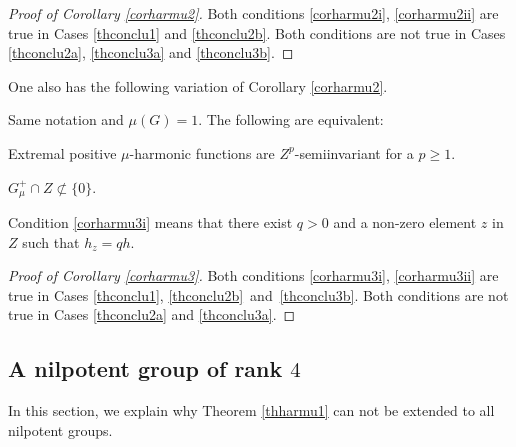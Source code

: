 \begin{proof}[Proof of Corollary \ref{corharmu2}]
Both conditions \eqref{corharmu2i}, \eqref{corharmu2ii}
are true in Cases \eqref{thconclu1} and \eqref{thconclu2b}.
Both conditions
are not true in Cases \eqref{thconclu2a}, \eqref{thconclu3a} and \eqref{thconclu3b}.
\end{proof}

One also has the following variation of Corollary \ref{corharmu2}.

\begin{Cor}
\label{corharmu3}
Same notation and $\mu(G)=1$.
The following are equivalent:
\begin{enumeratei}
\item\label{corharmu3i}
Extremal positive $\mu$-harmonic functions are $Z^{p}$-semiinvariant
for a $p\geq 1$.
\item\label{corharmu3ii}
$G_\mu^+\cap Z\not\subset\{0\}$.
\end{enumeratei}
\end{Cor}

Condition \eqref{corharmu3i} means that there exist $q>0$ and a non-zero element $z$ in $Z$
such that $h_z=qh$.

\begin{proof}[Proof of Corollary \ref{corharmu3}]
Both conditions \eqref{corharmu3i}, \eqref{corharmu3ii}
are true in Cases \eqref{thconclu1}, \eqref{thconclu2b}~and~\eqref{thconclu3b}.
Both conditions
are not true in Cases \eqref{thconclu2a} and \eqref{thconclu3a}.
\end{proof}

\subsection{A nilpotent group of rank $4$}
\label{secrankfour}

\bq
In this section, we explain why Theorem \ref{thharmu1}
can not be extended to all nilpotent groups.
\eq

